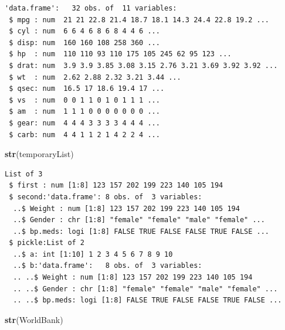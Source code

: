 \documentclass[
]{krantz}
\makeatletter
\newenvironment{Shaded}{\begin{snugshade}}{\end{snugshade}}
\newcommand{\KeywordTok}[1]{\textcolor[rgb]{0.27,0.27,0.27}{\textbf{#1}}}
\newcommand{\NormalTok}[1]{#1}
\newenvironment{kframe}{%
\medskip{}
\setlength{\fboxsep}{.8em}
 \def\at@end@of@kframe{}%
 \ifinner\ifhmode%
  \def\at@end@of@kframe{\end{minipage}}%
  \begin{minipage}{\columnwidth}%
 \fi\fi%
 \def\FrameCommand##1{\hskip\@totalleftmargin \hskip-\fboxsep
 \colorbox{shadecolor}{##1}\hskip-\fboxsep
     \hskip-\linewidth \hskip-\@totalleftmargin \hskip\columnwidth}%
 \MakeFramed {\advance\hsize-\width
   \@totalleftmargin\z@ \linewidth\hsize
   \@setminipage}}%
 {\par\unskip\endMakeFramed%
 \at@end@of@kframe}
\renewenvironment{Shaded}{\begin{kframe}}{\end{kframe}}
\makeatother
\begin{document}
\begin{verbatim}
'data.frame':	32 obs. of  11 variables:
 $ mpg : num  21 21 22.8 21.4 18.7 18.1 14.3 24.4 22.8 19.2 ...
 $ cyl : num  6 6 4 6 8 6 8 4 4 6 ...
 $ disp: num  160 160 108 258 360 ...
 $ hp  : num  110 110 93 110 175 105 245 62 95 123 ...
 $ drat: num  3.9 3.9 3.85 3.08 3.15 2.76 3.21 3.69 3.92 3.92 ...
 $ wt  : num  2.62 2.88 2.32 3.21 3.44 ...
 $ qsec: num  16.5 17 18.6 19.4 17 ...
 $ vs  : num  0 0 1 1 0 1 0 1 1 1 ...
 $ am  : num  1 1 1 0 0 0 0 0 0 0 ...
 $ gear: num  4 4 4 3 3 3 3 4 4 4 ...
 $ carb: num  4 4 1 1 2 1 4 2 2 4 ...
\end{verbatim}

\begin{Shaded}
\begin{Highlighting}[]
\KeywordTok{str}\NormalTok{(temporaryList)}
\end{Highlighting}
\end{Shaded}

\begin{verbatim}
List of 3
 $ first : num [1:8] 123 157 202 199 223 140 105 194
 $ second:'data.frame':	8 obs. of  3 variables:
  ..$ Weight : num [1:8] 123 157 202 199 223 140 105 194
  ..$ Gender : chr [1:8] "female" "female" "male" "female" ...
  ..$ bp.meds: logi [1:8] FALSE TRUE FALSE FALSE TRUE FALSE ...
 $ pickle:List of 2
  ..$ a: int [1:10] 1 2 3 4 5 6 7 8 9 10
  ..$ b:'data.frame':	8 obs. of  3 variables:
  .. ..$ Weight : num [1:8] 123 157 202 199 223 140 105 194
  .. ..$ Gender : chr [1:8] "female" "female" "male" "female" ...
  .. ..$ bp.meds: logi [1:8] FALSE TRUE FALSE FALSE TRUE FALSE ...
\end{verbatim}

\begin{Shaded}
\begin{Highlighting}[]
\KeywordTok{str}\NormalTok{(WorldBank)}
\end{Highlighting}
\end{Shaded}
\end{document}

